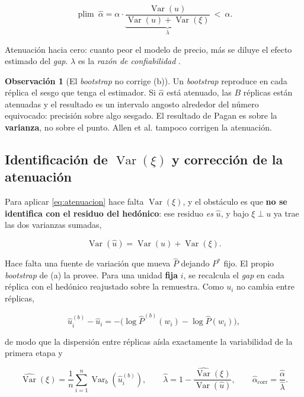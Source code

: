 \documentclass[11pt,a4paper]{article}
\theoremstyle{definition}
\newtheorem{observacion}{Observación}
\newcommand{\Var}{\operatorname{Var}}
\newcommand{\plim}{\operatorname*{plim}}
\begin{document}
\begin{equation}
\plim\ \hat{\alpha}
=\alpha\cdot\underbrace{\frac{\Var(u)}{\Var(u)+\Var(\xi)}}_{\textstyle\lambda}\ <\ \alpha .
\label{eq:atenuacion}
\end{equation}

Atenuación hacia cero: cuanto peor el modelo de precio, más se diluye el efecto
estimado del \emph{gap}. $\lambda$ es la \emph{razón de confiabilidad}
\cite{fuller1987}.

\begin{observacion}[El \emph{bootstrap} no corrige (b)]
Un \emph{bootstrap} reproduce en cada réplica el sesgo que tenga el estimador. Si
$\hat{\alpha}$ está atenuado, las $B$ réplicas están atenuadas y el resultado es un
intervalo angosto alrededor del número equivocado: precisión sobre algo sesgado. El
resultado de Pagan es sobre la \textbf{varianza}, no sobre el punto. Allen et al.
tampoco corrigen la atenuación.
\end{observacion}

\subsection{Identificación de $\Var(\xi)$ y corrección de la atenuación}

Para aplicar \eqref{eq:atenuacion} hace falta $\Var(\xi)$, y el obstáculo es que
\textbf{no se identifica con el residuo del hedónico}: ese residuo \emph{es}
$\hat{u}$, y bajo $\xi\perp u$ ya trae las dos varianzas sumadas,

\begin{equation}
\Var(\hat{u})=\Var(u)+\Var(\xi).
\label{eq:varsuma}
\end{equation}

Hace falta una fuente de variación que mueva $\hat{P}$ dejando $P^{*}$ fijo. El
propio \emph{bootstrap} de (a) la provee. Para una unidad \textbf{fija} $i$, se
recalcula el \emph{gap} en cada réplica con el hedónico reajustado sobre la
remuestra. Como $u_i$ no cambia entre réplicas,

\begin{equation}
\hat{u}_i^{(b)}-\hat{u}_i
=-\bigl(\log\hat{P}^{(b)}(w_i)-\log\hat{P}(w_i)\bigr),
\label{eq:gapreplica}
\end{equation}

de modo que la dispersión entre réplicas aísla exactamente la variabilidad de la
primera etapa y

\begin{equation}
\widehat{\Var}(\xi)=\frac{1}{n}\sum_{i=1}^{n}\Var_b\!\left(\hat{u}_i^{(b)}\right),
\qquad
\hat{\lambda}=1-\frac{\widehat{\Var}(\xi)}{\Var(\hat{u})},
\qquad
\hat{\alpha}_{\text{corr}}=\frac{\hat{\alpha}}{\hat{\lambda}} .
\label{eq:lambda}
\end{equation}
\end{document}
